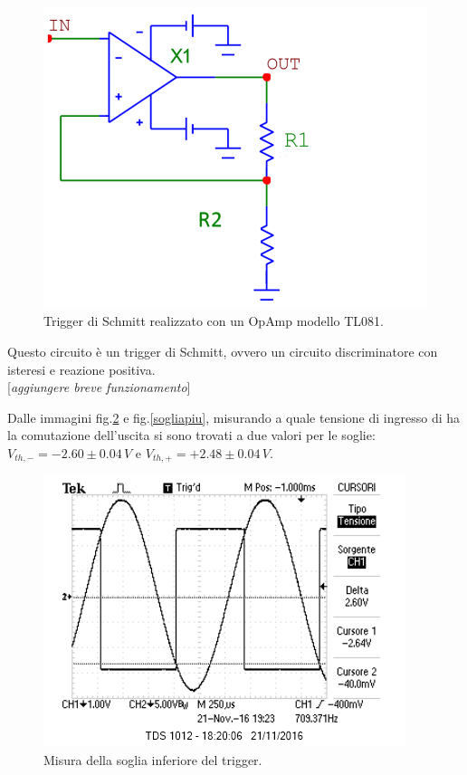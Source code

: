 \documentclass[10pt,a4paper]{article}
\newcommand{\rem}[1]{[\emph{#1}]}
\begin{document}
\begin{figure}[h]
\centering
\includegraphics[scale=0.5]{triggerSchmitt.png}
\caption{ Trigger di Schmitt realizzato con un OpAmp modello TL081.\label{circuito3}}
\end{figure}

Questo circuito è un trigger di Schmitt, ovvero un circuito discriminatore con isteresi e reazione positiva.\\

\rem{aggiungere breve funzionamento}

Dalle immagini fig.\ref{sogliameno} e fig.\ref{sogliapiu}, misurando a quale tensione di ingresso di ha la comutazione dell'uscita si sono trovati a due valori per le soglie: $V_{th, -} =-2.60 \pm 0.04 \, V $ e $V_{th, +} = +2.48 \pm 0.04 \, V$.

\begin{figure}[h]
\centering
\includegraphics[scale=0.5]{immagini/FotoRicordoVth1.png}
\caption{Misura della soglia inferiore del trigger.}
\label{sogliameno}
\end{figure}
\end{document}
